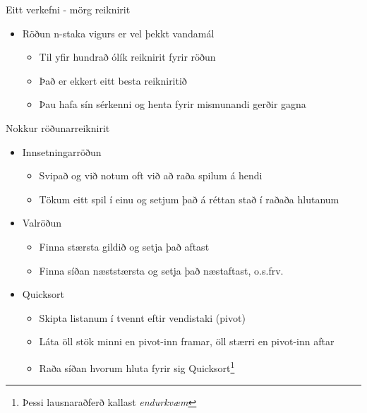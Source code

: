 \documentclass[handout]{beamer}
\begin{document}
\begin{frame}{Eitt verkefni - mörg reiknirit}
\begin{itemize}
 \item Röðun n-staka vigurs er vel þekkt vandamál
 \begin{itemize}
  \item Til yfir hundrað ólík reiknirit fyrir röðun
  \item Það er ekkert eitt besta reikniritið
  \item Þau hafa sín sérkenni og henta fyrir mismunandi gerðir gagna
 \end{itemize}
\end{itemize}
\end{frame}

\begin{frame}{Nokkur röðunarreiknirit}
\begin{itemize}
 \item Innsetningarröðun
 \begin{itemize}
  \item Svipað og við notum oft við að raða spilum á hendi
  \item Tökum eitt spil í einu og setjum það á réttan stað í raðaða hlutanum
 \end{itemize}
 \item Valröðun
 \begin{itemize}
  \item Finna stærsta gildið og setja það aftast
  \item Finna síðan næststærsta og setja það næstaftast, o.s.frv.
 \end{itemize}
 \item Quicksort
 \begin{itemize}
  \item Skipta listanum í tvennt eftir vendistaki (pivot)
  \item Láta öll stök minni en pivot-inn framar, öll stærri en pivot-inn aftar
  \item Raða síðan hvorum hluta fyrir sig Quicksort\footnote{Þessi lausnaraðferð kallast \emph{endurkvæm}}
 \end{itemize}
\end{itemize}
\end{frame}
\end{document}
